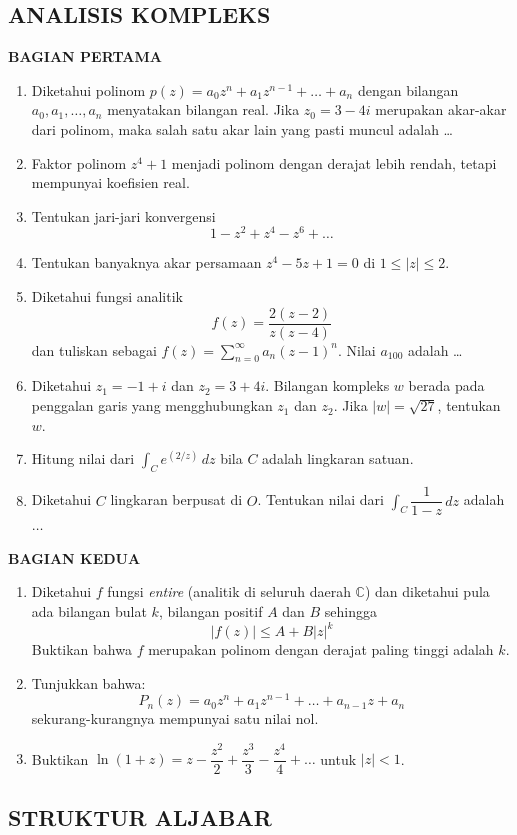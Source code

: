 \documentclass[12pt,twoside]{article}
\begin{document}
\newpage
\subsection{ANALISIS KOMPLEKS}
\textbf{BAGIAN PERTAMA}
\begin{enumerate}
	\item Diketahui polinom $p(z)=a_0z^n+a_1z^{n-1}+\dots+a_n$ dengan bilangan $a_0,a_1,\dots,a_n$ menyatakan bilangan real. Jika $z_0=3-4i$ merupakan akar-akar dari polinom, maka salah satu akar lain yang pasti muncul adalah \dots
	\item Faktor polinom $z^4+1$ menjadi polinom dengan derajat lebih rendah, tetapi mempunyai koefisien real.
	\item Tentukan jari-jari konvergensi $$1-z^2+z^4-z^6+\dots$$
	\item Tentukan banyaknya akar persamaan $z^4-5z+1=0$ di $1\leq |z|\leq 2$.
	\item Diketahui fungsi analitik $$f(z)=\dfrac{2(z-2)}{z(z-4)}$$
	      dan tuliskan sebagai $\displaystyle f(z)=\sum_{n=0}^{\infty}a_n(z-1)^n$. Nilai $a_{100}$ adalah \dots
	\item Diketahui $z_1=-1+i$ dan $z_2=3+4i$. Bilangan kompleks $w$ berada pada penggalan garis yang mengghubungkan $z_1$ dan $z_2$. Jika $|w|=\sqrt{27}$, tentukan $w$.
	\item Hitung nilai dari $\displaystyle \int_{C}e^{(2/z)}\, dz$ bila $C$ adalah lingkaran satuan.
	\item Diketahui $C$ lingkaran berpusat di $O$. Tentukan nilai dari $\displaystyle \int_{C}\dfrac{1}{1-z}\, dz$ adalah $\dots$
\end{enumerate}
\newpage
\newpage \textbf{BAGIAN KEDUA}
\begin{enumerate}
	\item Diketahui $f$ fungsi \textit{entire} (analitik di seluruh daerah $\mathbb{C}$) dan diketahui pula ada bilangan bulat $k$, bilangan positif $A$ dan $B$ sehingga
	      $$|f(z)|\leq A+B|z|^k$$
	      Buktikan bahwa $f$ merupakan polinom dengan derajat paling tinggi adalah $k$.
	\item Tunjukkan bahwa:
	      $$P_n(z)=a_0z^n+a_1z^{n-1}+\dots+a_{n-1}z+a_n$$
	      sekurang-kurangnya mempunyai satu nilai nol.
	\item Buktikan $\ln(1+z)=z-\dfrac{z^2}{2}+\dfrac{z^3}{3}-\dfrac{z^4}{4}+\dots$ untuk $|z|<1$.
\end{enumerate}
\newpage \subsection{STRUKTUR ALJABAR}
\end{document}
